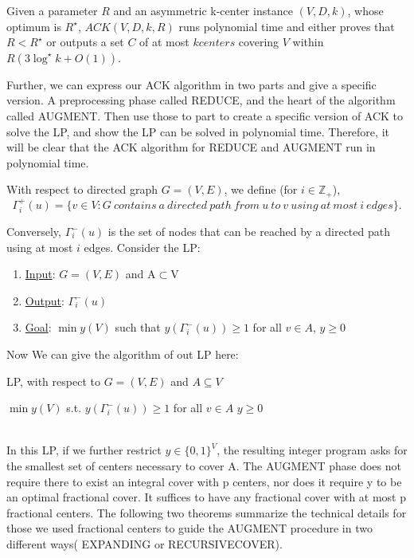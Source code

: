 \begin{theorem}
Given a parameter $ R $ and an asymmetric k-center instance $(V,D,k)$, whose optimum is $R^\star$, $ACK(V,D,k,R) $ runs polynomial time and either proves that $ R<R^\star $ or outputs a set $C$ of at most $k centers$ covering $V$ within $R(3\log^\star k + O(1))$.
\end{theorem}

Further, we can express our ACK algorithm in two parts and give a specific version. A preprocessing phase called REDUCE, and the heart of the algorithm called AUGMENT. Then use those to part to create a specific version of ACK to solve the LP, and show the LP can be solved in polynomial time. Therefore, it will be clear that the ACK algorithm for REDUCE and AUGMENT run in polynomial time.

\begin{definition}
With respect to directed graph $G=(V,E)$, we define (for $i\in \mathbb{Z}_+$),
$$\Gamma_i^+(u)=\{v\in V : G \ contains \ a \ directed\  path\ from\ u\ to\ v\ using\ at\ most\ i\ edges \}.$$
\end{definition}
Conversely, $\Gamma_i^-(u)$ is the set of nodes that can be reached by a directed path using at most $i$ edges. Consider the LP:

\begin{enumerate}
\item \underline{Input}: $G=(V, E)$ and A$\subset$V
\item \underline{Output}: $\Gamma_i^-(u)$
\item \underline{Goal}: $\min y(V)$ such that $y(\Gamma_i^-(u) )\geq 1$ for all $v \in A$, $y \geq 0$
\end{enumerate}

Now We can give the algorithm of out LP here:\\
\begin{algorithm}
\caption{LP, with respect to $G=(V,E)$ and $A \subseteq V$}
 $\min y(V)$ \;
 s.t. $y(\Gamma_i^-(u))\geq 1$ for all $v \in A$\;
 $y\geq 0$\;
\end{algorithm}\\
In this LP, if we further restrict $y\in \{ 0, 1\}^V$, the resulting integer program asks for the smallest set of centers necessary to cover A. The AUGMENT phase does not require there to exist an integral cover with p centers, nor does it require y to be an optimal fractional cover. It suffices to have any fractional cover with at most p fractional centers. The following two theorems summarize the technical details for those we used fractional centers to guide the AUGMENT procedure in two different ways( EXPANDING or RECURSIVECOVER).

